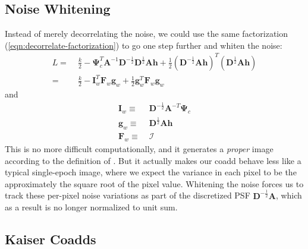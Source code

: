 \documentclass[10pt]{article}
\newcommand{\eqnref}[1]{(\ref{eqn:#1})}
\begin{document}
\subsection{Noise Whitening}
\label{sec:whitening}

Instead of merely decorrelating the noise, we could use the same factorization \eqnref{decorrelate-factorization} to go one step further and whiten the noise:
\begin{align}
L
=\;& \frac{k}{2} - \bm{\Psi}_c^T\!\bm{A}^{-1}\bm{D}^{-\frac{1}{2}}
    \!\bm{D}^{\frac{1}{2}}\!\bm{A}\bm{h}
    + \frac{1}{2}\left(\bm{D}^{-\frac{1}{2}}\!\bm{A}\bm{h}\right)^T\!
    \!\left(\bm{D}^{\frac{1}{2}}\!\bm{A}\bm{h}\right)
    \\
=\;& \frac{k}{2} - \bm{I}_w^T\!\bm{F}_w\bm{g}_w
    + \frac{1}{2}\bm{g}_w^T\!\bm{F}_w\bm{g}_w
\label{eqn:likelihood-whitened}
\end{align}
and
\begin{align}
\bm{I}_w \equiv\;& \bm{D}^{-\frac{1}{2}}\bm{A}^{-T}\bm{\Psi}_c \\
\bm{g}_w \equiv\;& \bm{D}^{\frac{1}{2}}\bm{A}\bm{h} \\
\bm{F}_w \equiv\;& \bm{\mathcal{I}}
\end{align}
This is no more difficult computationally, and it generates a \emph{proper} image according to the definition of \cite{2015arXiv151206879Z}.  But it actually makes our coadd behave less like a typical single-epoch image, where we expect the variance in each pixel to be the approximately the square root of the pixel value.  Whitening the noise forces us to track these per-pixel noise variations as part of the discretized PSF $\bm{D}^{-\frac{1}{2}}\bm{A}$, which as a result is no longer normalized to unit sum.

\subsection{Kaiser Coadds}
\label{sec:kaiser-coadds}
\end{document}
